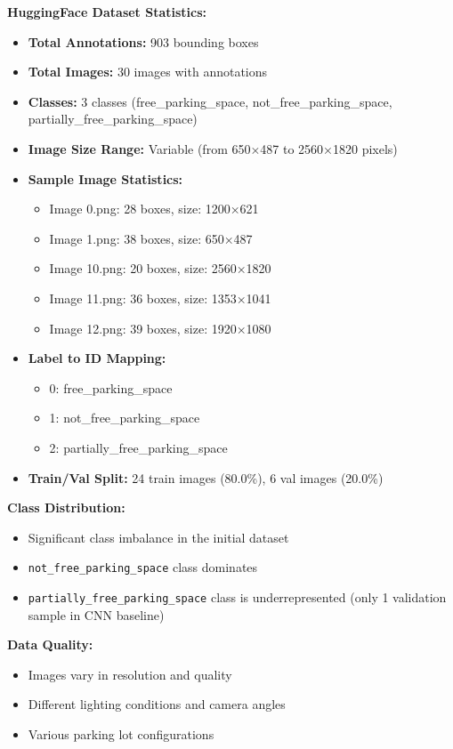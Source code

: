 \documentclass[12pt,a4paper]{article}
\begin{document}
\textbf{HuggingFace Dataset Statistics:}
\begin{itemize}
    \item \textbf{Total Annotations:} 903 bounding boxes
    \item \textbf{Total Images:} 30 images with annotations
    \item \textbf{Classes:} 3 classes (free\_parking\_space, not\_free\_parking\_space, partially\_free\_parking\_space)
    \item \textbf{Image Size Range:} Variable (from 650×487 to 2560×1820 pixels)
    \item \textbf{Sample Image Statistics:}
    \begin{itemize}
        \item Image 0.png: 28 boxes, size: 1200×621
        \item Image 1.png: 38 boxes, size: 650×487
        \item Image 10.png: 20 boxes, size: 2560×1820
        \item Image 11.png: 36 boxes, size: 1353×1041
        \item Image 12.png: 39 boxes, size: 1920×1080
    \end{itemize}
    \item \textbf{Label to ID Mapping:}
    \begin{itemize}
        \item 0: free\_parking\_space
        \item 1: not\_free\_parking\_space
        \item 2: partially\_free\_parking\_space
    \end{itemize}
    \item \textbf{Train/Val Split:} 24 train images (80.0\%), 6 val images (20.0\%)
\end{itemize}

\textbf{Class Distribution:}
\begin{itemize}
    \item Significant class imbalance in the initial dataset
    \item \texttt{not\_free\_parking\_space} class dominates
    \item \texttt{partially\_free\_parking\_space} class is underrepresented (only 1 validation sample in CNN baseline)
\end{itemize}

\textbf{Data Quality:}
\begin{itemize}
    \item Images vary in resolution and quality
    \item Different lighting conditions and camera angles
    \item Various parking lot configurations
\end{itemize}
\end{document}
